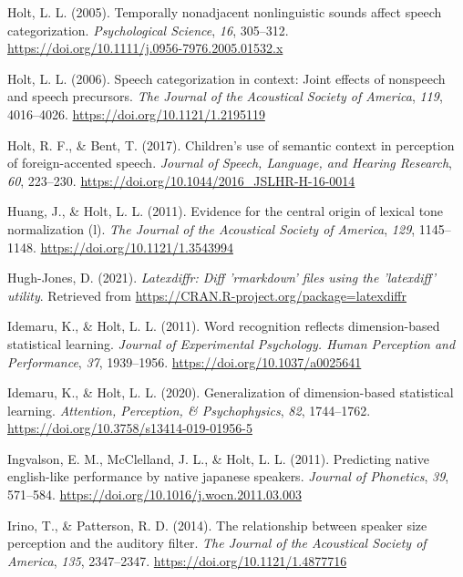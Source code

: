 \documentclass[
  11pt,
  man,floatsintext]{apa6}
\newlength{\cslhangindent}
\newlength{\cslentryspacingunit} %
\newenvironment{CSLReferences}[2] %
 {%
  \setlength{\parindent}{0pt}
  \ifodd #1
  \let\oldpar\par
  \def\par{\hangindent=\cslhangindent\oldpar}
  \fi
  \setlength{\parskip}{#2\cslentryspacingunit}
 }%
 {}
\begin{document}
\begin{CSLReferences}{1}{0}
\leavevmode{}%
Holt, L. L. (2005). Temporally nonadjacent nonlinguistic sounds affect speech categorization. \emph{Psychological Science}, \emph{16}, 305--312. \url{https://doi.org/10.1111/j.0956-7976.2005.01532.x}

\leavevmode{}%
Holt, L. L. (2006). Speech categorization in context: Joint effects of nonspeech and speech precursors. \emph{The Journal of the Acoustical Society of America}, \emph{119}, 4016--4026. \url{https://doi.org/10.1121/1.2195119}

\leavevmode{}%
Holt, R. F., \& Bent, T. (2017). Children's use of semantic context in perception of foreign-accented speech. \emph{Journal of Speech, Language, and Hearing Research}, \emph{60}, 223--230. \url{https://doi.org/10.1044/2016_JSLHR-H-16-0014}

\leavevmode{}%
Huang, J., \& Holt, L. L. (2011). Evidence for the central origin of lexical tone normalization (l). \emph{The Journal of the Acoustical Society of America}, \emph{129}, 1145--1148. \url{https://doi.org/10.1121/1.3543994}

\leavevmode{}%
Hugh-Jones, D. (2021). \emph{Latexdiffr: Diff 'rmarkdown' files using the 'latexdiff' utility}. Retrieved from \url{https://CRAN.R-project.org/package=latexdiffr}

\leavevmode{}%
Idemaru, K., \& Holt, L. L. (2011). Word recognition reflects dimension-based statistical learning. \emph{Journal of Experimental Psychology. Human Perception and Performance}, \emph{37}, 1939--1956. \url{https://doi.org/10.1037/a0025641}

\leavevmode{}%
Idemaru, K., \& Holt, L. L. (2020). Generalization of dimension-based statistical learning. \emph{Attention, Perception, \& Psychophysics}, \emph{82}, 1744--1762. \url{https://doi.org/10.3758/s13414-019-01956-5}

\leavevmode{}%
Ingvalson, E. M., McClelland, J. L., \& Holt, L. L. (2011). Predicting native english-like performance by native japanese speakers. \emph{Journal of Phonetics}, \emph{39}, 571--584. \url{https://doi.org/10.1016/j.wocn.2011.03.003}

\leavevmode{}%
Irino, T., \& Patterson, R. D. (2014). The relationship between speaker size perception and the auditory filter. \emph{The Journal of the Acoustical Society of America}, \emph{135}, 2347--2347. \url{https://doi.org/10.1121/1.4877716}


\end{CSLReferences}
\end{document}
